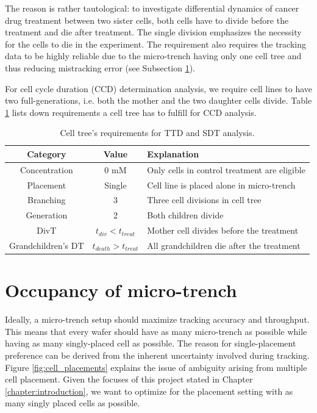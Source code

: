 \documentclass[pdftex,12pt,a4paper]{report}
\begin{document}
The reason is rather tautological: to investigate differential dynamics of cancer drug treatment between two sister cells, both cells have to divide before the treatment and die after treatment. The single division emphasizes the necessity for the cells to die in the experiment. The requirement also requires the tracking data to be highly reliable due to the micro-trench having only one cell tree and thus reducing mistracking error (see Subsection \ref{section:occupancy_of_microtrench}).

For cell cycle duration (CCD) determination analysis, we require cell lines to have two full-generations, i.e. both the mother and the two daughter cells divide. Table \ref{table:cell_reqs_ccd} lists down requirements a cell tree has to fulfill for CCD analysis.

\begin{table}[H]
\centering
\begin{tabular}{ c | c | l }
Category & Value & Explanation \\
\hline
Concentration & 0 mM & Only cells in control treatment are eligible\\
Placement & Single & Cell line is placed alone in micro-trench \\
Branching & 3 & Three cell divisions in cell tree \\
Generation & 2 & Both children divide \\
DivT & $t_{div} < t_{treat}$ & Mother cell divides before the treatment\\
Grandchildren's DT & $t_{death} > t_{treat}$  & All grandchildren die after the treatment
\end{tabular}
\caption[Cell tree's requirements for TTD and SDT analysis]{Cell tree's requirements for TTD and SDT analysis.}
\label{table:cell_reqs_ccd}
\end{table}

\section{Occupancy of micro-trench}
\label{section:occupancy_of_microtrench}

Ideally, a micro-trench setup should maximize tracking accuracy and throughput. This means that every wafer should have as many micro-trench as possible while having as many singly-placed cell as possible. The reason for single-placement preference can be derived from the inherent uncertainty involved during tracking. Figure \ref{fig:cell_placements} explains the issue of ambiguity arising from multiple cell placement. Given the focuses of this project stated in Chapter \ref{chapter:introduction}, we want to optimize for the placement setting with as many singly placed cells as possible.
\end{document}

